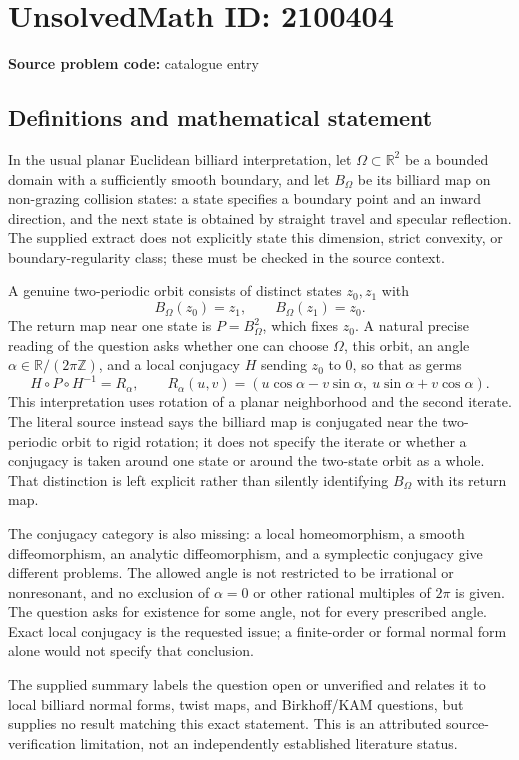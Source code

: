 \documentclass[11pt]{article}
\newcommand{\Z}{\mathbb{Z}}
\newcommand{\R}{\mathbb{R}}
\begin{document}
\section*{UnsolvedMath ID: 2100404}
\textbf{Source problem code:} catalogue entry
\subsection{Definitions and mathematical statement}
In the usual planar Euclidean billiard interpretation, let $\Omega\subset\R^2$ be a bounded domain with a sufficiently smooth boundary, and let $B_\Omega$ be its billiard map on non-grazing collision states: a state specifies a boundary point and an inward direction, and the next state is obtained by straight travel and specular reflection. The supplied extract does not explicitly state this dimension, strict convexity, or boundary-regularity class; these must be checked in the source context.

A genuine two-periodic orbit consists of distinct states $z_0,z_1$ with
\[
B_\Omega(z_0)=z_1,\qquad B_\Omega(z_1)=z_0.
\]
The return map near one state is $P=B_\Omega^2$, which fixes $z_0$. A natural precise reading of the question asks whether one can choose $\Omega$, this orbit, an angle $\alpha\in\R/(2\pi\Z)$, and a local conjugacy $H$ sending $z_0$ to $0$, so that as germs
\[
H\circ P\circ H^{-1}=R_\alpha,\qquad
R_\alpha(u,v)=(u\cos\alpha-v\sin\alpha,\ u\sin\alpha+v\cos\alpha).
\]
This interpretation uses rotation of a planar neighborhood and the second iterate. The literal source instead says the billiard map is conjugated near the two-periodic orbit to rigid rotation; it does not specify the iterate or whether a conjugacy is taken around one state or around the two-state orbit as a whole. That distinction is left explicit rather than silently identifying $B_\Omega$ with its return map.

The conjugacy category is also missing: a local homeomorphism, a smooth diffeomorphism, an analytic diffeomorphism, and a symplectic conjugacy give different problems. The allowed angle is not restricted to be irrational or nonresonant, and no exclusion of $\alpha=0$ or other rational multiples of $2\pi$ is given. The question asks for existence for some angle, not for every prescribed angle. Exact local conjugacy is the requested issue; a finite-order or formal normal form alone would not specify that conclusion.

The supplied summary labels the question open or unverified and relates it to local billiard normal forms, twist maps, and Birkhoff/KAM questions, but supplies no result matching this exact statement. This is an attributed source-verification limitation, not an independently established literature status.
\end{document}
